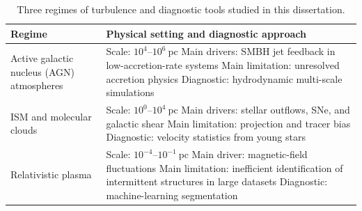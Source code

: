 \begin{table}[t]
\centering
\caption{Three regimes of turbulence and diagnostic tools studied in this dissertation.}
\label{tab:intro-regimes}
\renewcommand{\arraystretch}{1.25}
\begin{tabular}{@{}>{\raggedright\arraybackslash}p{}>{\raggedright\arraybackslash}p{}@{}}
\toprule
Regime & Physical setting and diagnostic approach \\
\midrule
Active galactic nucleus (AGN) atmospheres &
Scale: $10^4$--$10^6\ \mathrm{pc}$\newline
Main drivers: SMBH jet feedback in low-accretion-rate systems\newline
Main limitation: unresolved accretion physics\newline
Diagnostic: hydrodynamic multi-scale simulations \\
ISM and molecular clouds &
Scale: $10^0$--$10^4\ \mathrm{pc}$\newline
Main drivers: stellar outflows, SNe, and galactic shear\newline
Main limitation: projection and tracer bias\newline
Diagnostic: velocity statistics from young stars \\
Relativistic plasma &
Scale: $10^{-4}$--$10^{-1}\ \mathrm{pc}$\newline
Main driver: magnetic-field fluctuations\newline
Main limitation: inefficient identification of intermittent structures in large datasets\newline
Diagnostic: machine-learning segmentation \\
\bottomrule
\end{tabular}
\end{table}

